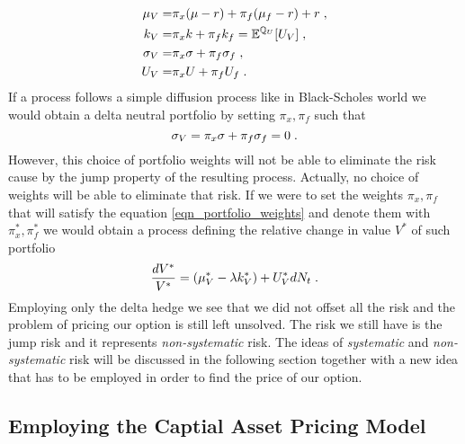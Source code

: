 \documentclass[times, utf8, diplomski]{fer}
\begin{document}
\begin{equation} \label{eqn_portfolio_params}
\begin{split}
	\mu_V =& \pi_x(\mu - r) + \pi_f(\mu_f - r) + r  \hspace{0.1cm},\\
	k_V =& \pi_x k + \pi_f k_f = \mathbb{E}^{\mathbb{Q}_U}[U_V]  \hspace{0.1cm},\\
	\sigma_V =& \pi_x\sigma + \pi_f\sigma_f  \hspace{0.1cm},\\
	U_V =& \pi_x U + \pi_f U_f \hspace{0.1cm}.
\end{split}
\end{equation}
If a process follows a simple diffusion process like in Black-Scholes world we would obtain a delta neutral portfolio by setting $\pi_x, \pi_f$ such that
\begin{equation} \label{eqn_portfolio_weights}
	\sigma_V = \pi_x\sigma + \pi_f\sigma_f = 0 \hspace{0.1cm}.
\end{equation}
However, this choice of portfolio weights will not be able to eliminate the risk cause by the jump property of the resulting process. Actually, no choice of weights will be able to eliminate that risk. If we were to set the weights $\pi_x, \pi_f$ that will satisfy the equation \ref{eqn_portfolio_weights} and denote them with $\pi_x^*, \pi_f^*$ we would obtain a process defining the relative change in value $V^*$ of such portfolio
\begin{equation}
	\frac{dV^*}{V^*} = (\mu_V^* - \lambda k_V^*) + U_V^* dN_t \hspace{0.1cm}.
\end{equation}
Employing only the delta hedge we see that we did not offset all the risk and the problem of pricing our option is still left unsolved. The risk we still have is the jump risk and it represents \textit{non-systematic} risk. The ideas of \textit{systematic} and \textit{non-systematic} risk will be discussed in the following section together with a new idea that has to be employed in order to find the price of our option.

\subsection{Employing the Captial Asset Pricing Model}
\end{document}
